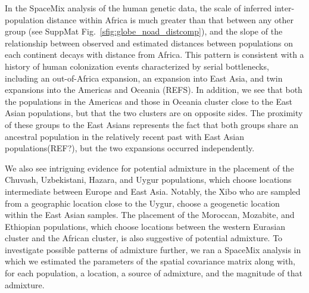 \documentclass[12pt]{article}
\newcommand{\plr}[1]{{\it\color{green}{(#1)}}}
\begin{document}
In the SpaceMix analysis of the human genetic data, the scale of inferred inter-population distance within Africa is much greater than that between any other group (see SuppMat Fig.\ \ref{sfig:globe_noad_distcomp}), and the slope of the relationship between observed and estimated distances between populations on each continent decays with distance from Africa.  This pattern is consistent with a history of human colonization events characterized by serial bottlenecks, including an out-of-Africa expansion, an expansion into East Asia, and twin expansions into the Americas and Oceania (REFS).  In addition, we see that both the populations in the Americas and those in Oceania cluster close to the East Asian populations, but that the two clusters are on opposite sides.  The proximity of these groups to the East Asians represents the fact that both groups share an ancestral population in the relatively recent past with East Asian populations(REF?), but the two expansions occurred independently.

\plr{Here the discussion sounds like by default, we'd expect these very different discrete groups, so that placement between them is recent admixture.  That would be true if most modern populations came from one of a few recent expansions.  A different prior would be that populations be uniformly distrubted, making the intermediate popluations expected, and the clustering something to explain.}
We also see intriguing evidence for potential admixture in the placement of the Chuvash, Uzbekistani, Hazara, and Uygur populations, which choose locations intermediate between Europe and East Asia.  Notably, the Xibo who are sampled from a geographic location close to the Uygur, choose a geogenetic location within the East Asian samples.  The placement of the Moroccan, Mozabite, and Ethiopian populations, which choose locations between the western Eurasian cluster and the African cluster, is also suggestive of potential admixture.  To investigate possible patterns of admixture further, we ran a SpaceMix analysis in which we estimated the parameters of the spatial covariance matrix along with, for each population, a location, a source of admixture, and the magnitude of that admixture.
\end{document}
